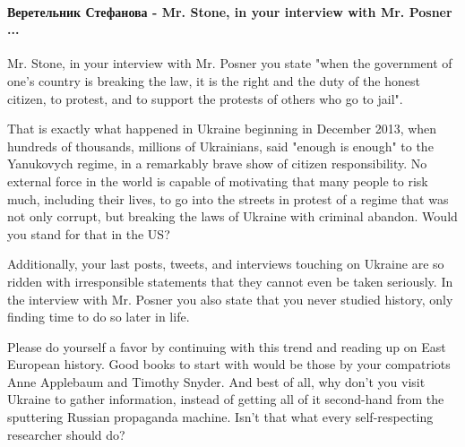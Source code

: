  
 
 
 
 
\paragraph{Веретельник Стефанова - Mr. Stone, in your interview with Mr. Posner ... }

\begin{itemize} %


Mr. Stone, in your interview with Mr. Posner you state "when the government of
one's country is breaking the law, it is the right and the duty of the honest
citizen, to protest, and to support the protests of others who go to jail".

That is exactly what happened in Ukraine beginning in December 2013, when
hundreds of thousands, millions of Ukrainians, said "enough is enough" to the
Yanukovych regime, in a remarkably brave show of citizen responsibility. No
external force in the world is capable of motivating that many people to risk
much, including their lives, to go into the streets in protest of a regime that
was not only corrupt, but breaking the laws of Ukraine with criminal abandon.
Would you stand for that in the US? 

Additionally, your last posts, tweets, and interviews touching on Ukraine are
so ridden with irresponsible statements that they cannot even be taken
seriously. In the interview with Mr. Posner you also state that you never
studied history, only finding time to do so later in life.

Please do yourself a favor by continuing with this trend and reading up on East
European history. Good books to start with would be those by your compatriots
Anne Applebaum and Timothy Snyder. And best of all, why don't you visit Ukraine
to gather information, instead of getting all of it second-hand from the
sputtering Russian propaganda machine. Isn't that what every self-respecting
researcher should do?

\begin{itemize} %


\end{itemize}
\end{itemize}
